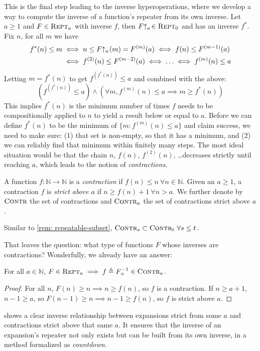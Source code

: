 This is the final step leading to the inverse hyperoperations, where we develop a way to compute the inverse of a function's repeater from its own inverse. Let $a\ge 1$ and $F\in \text{\scshape{Rept}}_a$ with inverse $f$, then $\rf{F}{a}\ \in \repeatable_0$ and has an inverse $f^*$. Fix $n$, for all $m$ we have
\begin{equation} \label{eq: rf-upp-inv}
\begin{aligned}
f^*(n)\le m & \iff n\le \rf{F}{a}(m) = F^{(m)}(a) \iff f(n)\le F^{(m-1)}(a) \\
& \iff f^{(2)}(n)\le F^{(m-2)}(a) \iff \ldots \iff f^{(m)}(n)\le a
\end{aligned} 
\end{equation}
Letting $m = f^*(n)$ to get $f^{(f^*(n))}\le a$ and combined with the above:
\begin{equation*}
\left(f^{(f^*(n))} \le a \right) \wedge \left( \forall m, f^{(m)}(n)\le a \implies m \ge f^*(n) \right)
\end{equation*}
This implies $f^*(n)$ is the minimum number of times $f$ needs to be compositionally applied to $n$ to yield a result below or equal to $a$. Before we can define $f^*(n)$ to be the minimum of $\{m: f^{(m)}(n)\le a \}$ and claim success, we need to make sure: (1) that set is non-empty, so that it has a minimum, and (2) we can reliably find that minimum within finitely many steps. The most ideal situation would be that the chain $n$, $f(n)$, $f^{(2)}(n)$, \ldots decreases strictly until reaching $a$, which leads to the notion of \emph{contractions}.
\begin{defn} \label{defn: contracting}
	A function $f : \mathbb{N} \to \mathbb{N}$ is a \textit{contraction} if $f(n) \le n \ \forall n\in \mathbb{N}$. Given an $a \ge 1$, a contraction $f$ is \textit{strict above} $a$ if $n\ge f(n)+1 \ \forall n > a$. We further denote by $\text{\scshape{Contr}}$ the set of contractions and $\text{\scshape{Contr}}_a$ the set of contractions strict above $a$.
\end{defn}
\begin{rem}
	Similar to \cref{rem: repeatable-subset}, $\text{\scshape{Contr}}_s \subset \text{\scshape{Contr}}_t \ \forall s\le t$.
\end{rem}
That leaves the question: what type of functions $F$ whose inverses are contractions? Wonderfully, we already have an answer:
\begin{thm} \label{thm: expansion-inv-contraction}
For all $a\in \mathbb{N}$, $F\in \text{\scshape{Rept}}_a \implies f\triangleq F^{-1}_+\in \text{\scshape{Contr}}_a$.
\end{thm}
\begin{proof}
For all $n$, $F(n)\ge n \implies n \ge f(n)$, so $f$ is a contraction. If $n\ge a+1$, $n-1\ge a$, so $F(n-1)\ge n \implies n-1\ge f(n)$, so $f$ is strict above $a$.
\end{proof}
 shows a clear inverse relationship between expansions strict from some $a$ and contractions strict above that same $a$. It ensures that the inverse of an expansion's repeater not only exists but can be built from its own inverse, in a method formalized as \emph{countdown}.

